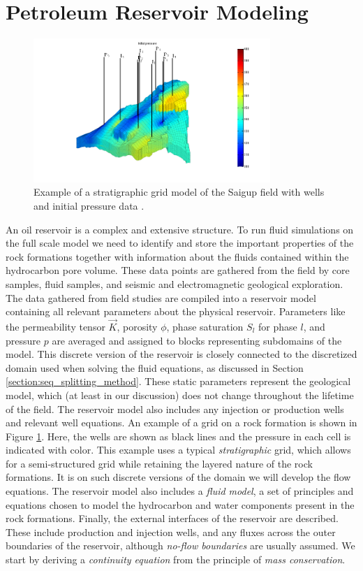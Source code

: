 \section{Petroleum Reservoir Modeling}
\label{section:reservoir_modeling}
\begin{figure}
\centering
\includegraphics[trim=3cm 0cm 2cm 0cm,width=0.8\textwidth]{figures/saigup_field_pressure.png}
\caption{Example of a stratigraphic grid model of the Saigup field with wells and initial pressure data \citep{saigup_2003}.}
\label{fig:saigup_field_pressure}
\end{figure}
An oil reservoir is a complex and extensive structure. To run fluid simulations on the full scale model we need to identify and store the important properties of the rock formations together with information about the fluids contained within the hydrocarbon pore volume. These data points are gathered from the field by core samples, fluid samples, and seismic and electromagnetic geological exploration. The data gathered from field studies are compiled into a reservoir model containing all relevant parameters about the physical reservoir. Parameters like the permeability tensor $\vec{K}$, porosity $\phi$, phase saturation $S_l$ for phase $l$, and pressure $p$ are averaged and assigned to blocks representing subdomains of the model. This discrete version of the reservoir is closely connected to the discretized domain used when solving the fluid equations, as discussed in Section \ref{section:seq_splitting_method}. These static parameters represent the geological model, which (at least in our discussion) does not change throughout the lifetime of the field. The reservoir model also includes any injection or production wells and relevant well equations. An example of a grid on a rock formation is shown in Figure \ref{fig:saigup_field_pressure}. Here, the wells are shown as black lines and the pressure in each cell is indicated with color. This example uses a typical \emph{stratigraphic} grid, which allows for a semi-structured grid while retaining the layered nature of the rock formations. It is on such discrete versions of the domain we will develop the flow equations. The reservoir model also includes a \emph{fluid model}, a set of principles and equations chosen to model the hydrocarbon and water components present in the rock formations. Finally, the external interfaces of the reservoir are described. These include production and injection wells, and any fluxes across the outer boundaries of the reservoir, although \emph{no-flow boundaries} are usually assumed. We start by deriving a \emph{continuity equation} from the principle of \emph{mass conservation}.

